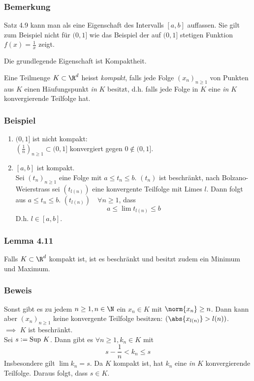 \subsubsection*{Bemerkung}
Satz 4.9 kann man als eine Eigenschaft des Intervalls $[a,b]$ auffassen. Sie gilt zum Beispiel nicht für $(0,1]$ wie das Beispiel der auf $(0,1]$ stetigen Funktion $f(x)=\frac{1}{x}$ zeigt.
\begin{center}
\end{center}
Die grundlegende Eigenschaft ist Kompaktheit.
\begin{definition}{4.10}
Eine Teilmenge $K\subset\R^{d}$ heisst \emph{kompakt}, falls jede Folge $(x_{n})_{n\geq 1}$ von Punkten aus $K$ einen Häufungspunkt \emph{in} $K$ besitzt, d.h. falls jede Folge in $K$ eine \emph{in} $K$ konvergierende Teilfolge hat.
\end{definition}

\subsubsection*{Beispiel}
\begin{enumerate}
\item $(0,1]$ ist nicht kompakt: \\
$(\frac{1}{n})_{n\geq 1} \subset (0,1]$ konvergiert gegen $0 \notin (0,1]$.
\item $[a,b]$ ist kompakt. \\
Sei $(t_{n})_{n\geq 1}$ eine Folge mit $a\leq t_{n} \leq b$. $(t_{n})$ ist beschränkt, nach Bolzano-Weierstrass sei $(t_{l(n)})$ eine konvergente Teilfolge mit Limes $l$. Dann folgt aus $a\leq t_{n} \leq b$. $(t_{l(n)})\quad \forall n\geq 1$, dass \[a\leq \lim{t_{l(n)}} \leq b\]
D.h. $l\in [a,b]$.
\end{enumerate}

\subsubsection*{Lemma 4.11}
Falls $K\subset\R^{d}$ kompakt ist, ist es beschränkt und besitzt zudem ein Minimum und Maximum.

\subsubsection*{Beweis}
Sonst gibt es zu jedem $n\geq 1, n\in \N$ ein $x_{n} \in K$ mit $\norm{x_{n}} \geq n$. Dann kann aber $(x_{n})_{n\geq 1}$ keine konvergente Teilfolge besitzen: $(\abs{x_{l(n)}} > l(n))$. \\
$\implies$ $K$ ist beschränkt. \\
Sei $s\vcentcolon= \text{Sup }K$. Dann gibt es $\forall n \geq 1, k_{n} \in K$ mit \[ s-\frac{1}{n}<k_{n}\leq s\]
Insbesondere gilt $\lim{k_{n}}=s$. Da $K$ kompakt ist, hat $k_{n}$ eine \emph{in $K$} konvergierende Teilfolge. Daraus folgt, dass $s\in K$.

